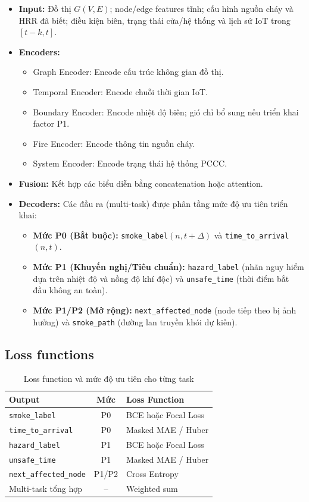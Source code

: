 \begin{itemize}
  \item \textbf{Input:} Đồ thị $G(V,E)$; node/edge features tĩnh; cấu hình nguồn cháy và HRR đã biết; điều kiện biên, trạng thái cửa/hệ thống và lịch sử IoT trong $[t-k,t]$.
  \item \textbf{Encoders:}
  \begin{itemize}
    \item Graph Encoder: Encode cấu trúc không gian đồ thị.
    \item Temporal Encoder: Encode chuỗi thời gian IoT.
    \item Boundary Encoder: Encode nhiệt độ biên; gió chỉ bổ sung nếu triển khai factor P1.
    \item Fire Encoder: Encode thông tin nguồn cháy.
    \item System Encoder: Encode trạng thái hệ thống PCCC.
  \end{itemize}
  \item \textbf{Fusion:} Kết hợp các biểu diễn bằng concatenation hoặc attention.
  \item \textbf{Decoders:} Các đầu ra (multi-task) được phân tầng mức độ ưu tiên triển khai:
  \begin{itemize}
    \item \textbf{Mức P0 (Bắt buộc):} \texttt{smoke\_label}$(n,t+\Delta)$ và \texttt{time\_to\_arrival}$(n,t)$.
    \item \textbf{Mức P1 (Khuyến nghị/Tiêu chuẩn):} \texttt{hazard\_label} (nhãn nguy hiểm dựa trên nhiệt độ và nồng độ khí độc) và \texttt{unsafe\_time} (thời điểm bắt đầu không an toàn).
    \item \textbf{Mức P1/P2 (Mở rộng):} \texttt{next\_affected\_node} (node tiếp theo bị ảnh hưởng) và \texttt{smoke\_path} (đường lan truyền khói dự kiến).
  \end{itemize}
\end{itemize}

\subsection{Loss functions}

\begin{table}[H]
\centering
\caption{Loss function và mức độ ưu tiên cho từng task}
\label{tab:loss}
\begin{tabular}{l c l}
\toprule
\textbf{Output} & \textbf{Mức} & \textbf{Loss Function} \\
\midrule
\texttt{smoke\_label}        & P0 & BCE hoặc Focal Loss \\
\texttt{time\_to\_arrival}   & P0 & Masked MAE / Huber \\
\texttt{hazard\_label}       & P1 & BCE hoặc Focal Loss \\
\texttt{unsafe\_time}        & P1 & Masked MAE / Huber \\
\texttt{next\_affected\_node} & P1/P2 & Cross Entropy \\
Multi-task tổng hợp          & -- & Weighted sum \\
\bottomrule
\end{tabular}
\end{table}

